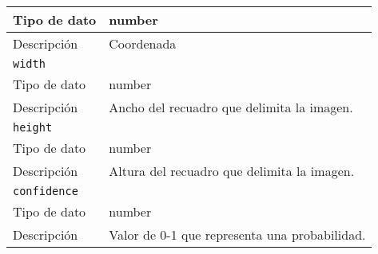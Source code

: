 \begin{longtable}{|l|l|}
Tipo de dato                                  & number                                                                                                                                         \\ \hline
Descripción                                   & Coordenada                                                                                                                                     \\ \hline
\multicolumn{2}{|l|}{\texttt{width}}                                                                                                                                                           \\ \hline
Tipo de dato                                  & number                                                                                                                                         \\ \hline
Descripción                                   & Ancho del recuadro que delimita la imagen.                                                                                                     \\ \hline
\multicolumn{2}{|l|}{\texttt{height}}                                                                                                                                                          \\ \hline
Tipo de dato                                  & number                                                                                                                                         \\ \hline
Descripción                                   & Altura del recuadro que delimita la imagen.                                                                                                    \\ \hline
\multicolumn{2}{|l|}{\texttt{confidence}}                                                                                                                                                      \\ \hline
Tipo de dato                                  & number                                                                                                                                         \\ \hline
Descripción                                   & Valor de 0-1 que representa una probabilidad.                                                                                                  \\ \hline

\end{longtable}
